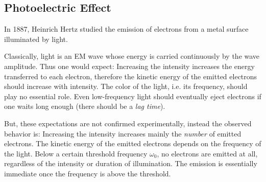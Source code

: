 




\subsection{Photoelectric Effect}


In 1887, Heinrich Hertz studied the emission of electrons from a metal surface illuminated by light.


Classically, light is an EM wave whose energy is carried continuously by the wave amplitude.
Thus one would expect:
Increasing the intensity increases the energy transferred to each electron,
 therefore the kinetic energy of the emitted electrons should increase with intensity.
The color of the light, i.e. its frequency, should play no essential role.
Even low-frequency light should eventually eject electrons if one waits long enough (there should be a \emph{lag time}).




But, these expectations are not confirmed experimentally, instead the observed behavior is:
Increasing the intensity increases mainly the \emph{number} of emitted electrons.
The kinetic energy of the emitted electrons depends on the frequency of the light.
Below a certain threshold frequency \(\omega_0\), no electrons are emitted at all, regardless of the intensity or duration of illumination.
The emission is essentially immediate once the frequency is above the threshold.

